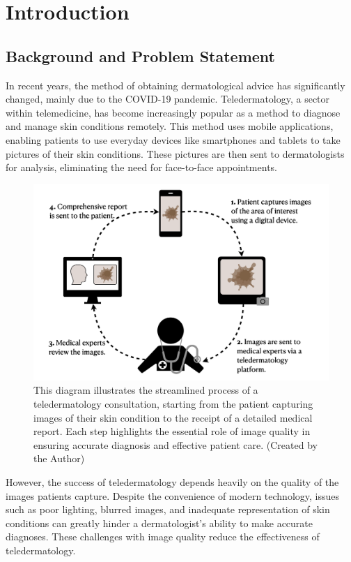 \chapter{Introduction}
\label{ch:Introduction}

\section{Background and Problem Statement}
\label{sec:BackgroundProblemStatement}
In recent years, the method of obtaining dermatological advice has significantly changed, mainly due to the COVID-19 pandemic. Teledermatology, a sector within telemedicine, has become increasingly popular as a method to diagnose and manage skin conditions remotely. This method uses mobile applications, enabling patients to use everyday devices like smartphones and tablets to take pictures of their skin conditions. These pictures are then sent to dermatologists for analysis, eliminating the need for face-to-face appointments. \par
\vspace{\baselineskip}
\begin{figure}[ht]
    \centering
    \includegraphics[keepaspectratio,width=15cm]{img/TD_workflow.png}
    \caption{This diagram illustrates the streamlined process of a teledermatology consultation, starting from the patient capturing images of their skin condition to the receipt of a detailed medical report. Each step highlights the essential role of image quality in ensuring accurate diagnosis and effective patient care. (Created by the Author)}
    \label{fig:TD_workflow}
\end{figure}
However, the success of teledermatology depends heavily on the quality of the images patients capture. Despite the convenience of modern technology, issues such as poor lighting, blurred images, and inadequate representation of skin conditions can greatly hinder a dermatologist's ability to make accurate diagnoses. These challenges with image quality reduce the effectiveness of teledermatology. \par
